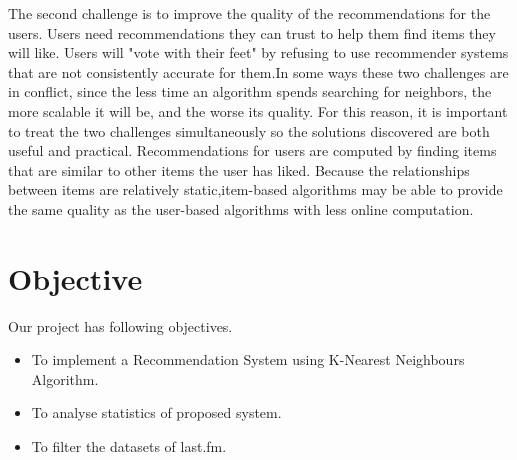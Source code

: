 \documentclass[paper=a4, fontsize=12pt]{scrartcl}
\numberwithin{equation}{section}		%
\numberwithin{figure}{section}			%
\numberwithin{table}{section}				%
\begin{document}
The second challenge is to improve the quality of the recommendations for the users. Users need recommendations they can trust to help them find items they will like. Users will "vote with their feet" by refusing to use recommender systems that are not consistently accurate for them.In some ways these two challenges are in conflict, since the less time an algorithm spends searching for neighbors, the more scalable it will be, and the worse its quality. For this reason, it is important to treat the two challenges simultaneously so the solutions discovered are both useful and practical.
Recommendations for users are computed by finding items that are similar to other items the user has liked. Because the relationships between items are relatively static,item-based algorithms may be able to provide the same quality as the user-based algorithms with less online computation.

\section{Objective}
Our project has following objectives.
\begin{itemize}	
  \item To implement a Recommendation System using K-Nearest Neighbours Algorithm.
  \item To analyse statistics of proposed system.
  \item To filter the datasets of last.fm.  
\end{itemize}
\end{document}
